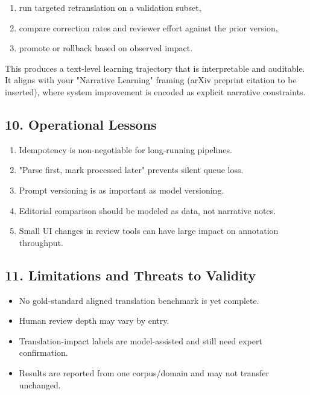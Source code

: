 \documentclass[
]{article}
\providecommand{\tightlist}{%
  \setlength{\itemsep}{0pt}\setlength{\parskip}{0pt}}
\begin{document}
\begin{enumerate}
\def\labelenumi{\arabic{enumi}.}
\tightlist
\item
  run targeted retranslation on a validation subset,
\item
  compare correction rates and reviewer effort against the prior
  version,
\item
  promote or rollback based on observed impact.
\end{enumerate}

This produces a text-level learning trajectory that is interpretable and
auditable. It aligns with your "Narrative Learning" framing (arXiv
preprint citation to be inserted), where system improvement is encoded
as explicit narrative constraints.

\hypertarget{10-operational-lessons}{%
\subsection{10. Operational Lessons}\label{10-operational-lessons}}

\begin{enumerate}
\def\labelenumi{\arabic{enumi}.}
\tightlist
\item
  Idempotency is non-negotiable for long-running pipelines.
\item
  "Parse first, mark processed later" prevents silent queue loss.
\item
  Prompt versioning is as important as model versioning.
\item
  Editorial comparison should be modeled as data, not narrative notes.
\item
  Small UI changes in review tools can have large impact on annotation
  throughput.
\end{enumerate}

\hypertarget{11-limitations-and-threats-to-validity}{%
\subsection{11. Limitations and Threats to
Validity}\label{11-limitations-and-threats-to-validity}}

\begin{itemize}
\tightlist
\item
  No gold-standard aligned translation benchmark is yet complete.
\item
  Human review depth may vary by entry.
\item
  Translation-impact labels are model-assisted and still need expert
  confirmation.
\item
  Results are reported from one corpus/domain and may not transfer
  unchanged.
\end{itemize}
\end{document}
